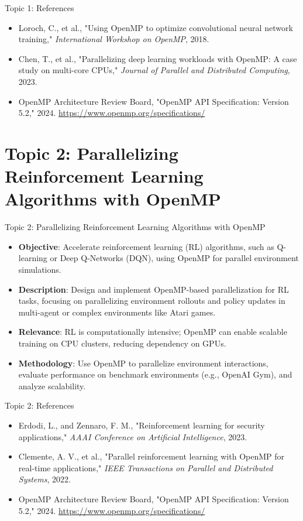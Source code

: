 \documentclass{beamer}
\begin{document}
\begin{frame}{Topic 1: References}
\begin{itemize}
    \item  
          Loroch, C., et al., "Using OpenMP to optimize convolutional neural network training," \textit{International Workshop on OpenMP}, 2018.
    \item 
          Chen, T., et al., "Parallelizing deep learning workloads with OpenMP: A case study on multi-core CPUs," \textit{Journal of Parallel and Distributed Computing}, 2023.
    \item  
          OpenMP Architecture Review Board, "OpenMP API Specification: Version 5.2," 2024. \url{https://www.openmp.org/specifications/}
\end{itemize}
\end{frame}

\section{Topic 2: Parallelizing Reinforcement Learning Algorithms with OpenMP}
\begin{frame}{Topic 2: Parallelizing Reinforcement Learning Algorithms with OpenMP}
\begin{itemize}
    \item \textbf{Objective}: Accelerate reinforcement learning (RL) algorithms, such as Q-learning or Deep Q-Networks (DQN), using OpenMP for parallel environment simulations.
    \item \textbf{Description}: Design and implement OpenMP-based parallelization for RL tasks, focusing on parallelizing environment rollouts and policy updates in multi-agent or complex environments like Atari games.
    \item \textbf{Relevance}: RL is computationally intensive; OpenMP can enable scalable training on CPU clusters, reducing dependency on GPUs.
    \item \textbf{Methodology}: Use OpenMP to parallelize environment interactions, evaluate performance on benchmark environments (e.g., OpenAI Gym), and analyze scalability.
\end{itemize}
\end{frame}

\begin{frame}{Topic 2: References}
\begin{itemize}
    \item  
          Erdodi, L., and Zennaro, F. M., "Reinforcement learning for security applications," \textit{AAAI Conference on Artificial Intelligence}, 2023.
    \item  
          Clemente, A. V., et al., "Parallel reinforcement learning with OpenMP for real-time applications," \textit{IEEE Transactions on Parallel and Distributed Systems}, 2022.
    \item  
          OpenMP Architecture Review Board, "OpenMP API Specification: Version 5.2," 2024. \url{https://www.openmp.org/specifications/}
\end{itemize}
\end{frame}
\end{document}
